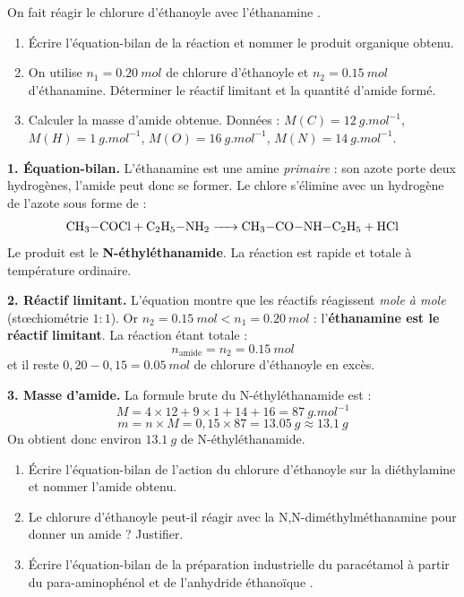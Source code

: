 \documentclass[11pt]{article}
\begin{document}
\begin{exoresolu}
On fait réagir le chlorure d'éthanoyle  avec l'éthanamine .
\begin{enumerate}
\item Écrire l'équation-bilan de la réaction et nommer le produit organique obtenu.
\item On utilise $n_1 = \SI{0,20}{mol}$ de chlorure d'éthanoyle et $n_2 = \SI{0,15}{mol}$ d'éthanamine. Déterminer le réactif limitant et la quantité d'amide formé.
\item Calculer la masse d'amide obtenue. Données : $M(C)=\SI{12}{g.mol^{-1}}$, $M(H)=\SI{1}{g.mol^{-1}}$, $M(O)=\SI{16}{g.mol^{-1}}$, $M(N)=\SI{14}{g.mol^{-1}}$.
\end{enumerate}
\tcblower
\textbf{1. Équation-bilan.} L'éthanamine est une amine \emph{primaire} : son azote porte deux hydrogènes, l'amide peut donc se former. Le chlore s'élimine avec un hydrogène de l'azote sous forme de  :
\[ \ce{CH3-COCl + C2H5-NH2 -> CH3-CO-NH-C2H5 + HCl} \]
Le produit est le \textbf{N-éthyléthanamide}. La réaction est rapide et totale à température ordinaire.

\textbf{2. Réactif limitant.} L'équation montre que les réactifs réagissent \emph{mole à mole} (stœchiométrie $1:1$). Or $n_2 = \SI{0,15}{mol} < n_1 = \SI{0,20}{mol}$ : l'\textbf{éthanamine est le réactif limitant}. La réaction étant totale :
\[ n_{\text{amide}} = n_2 = \SI{0,15}{mol} \]
et il reste $0{,}20 - 0{,}15 = \SI{0,05}{mol}$ de chlorure d'éthanoyle en excès.

\textbf{3. Masse d'amide.} La formule brute du N-éthyléthanamide  est  :
\[ M = 4 \times 12 + 9 \times 1 + 14 + 16 = \SI{87}{g.mol^{-1}} \]
\[ m = n \times M = 0{,}15 \times 87 = \SI{13,05}{g} \approx \SI{13,1}{g} \]
On obtient donc environ $\SI{13,1}{g}$ de N-éthyléthanamide.
\end{exoresolu}

\begin{exercice}
\begin{enumerate}
\item Écrire l'équation-bilan de l'action du chlorure d'éthanoyle sur la diéthylamine  et nommer l'amide obtenu.
\item Le chlorure d'éthanoyle peut-il réagir avec la N,N-diméthylméthanamine  pour donner un amide ? Justifier.
\item Écrire l'équation-bilan de la préparation industrielle du paracétamol à partir du para-aminophénol et de l'anhydride éthanoïque .
\end{enumerate}
\end{exercice}
\end{document}
